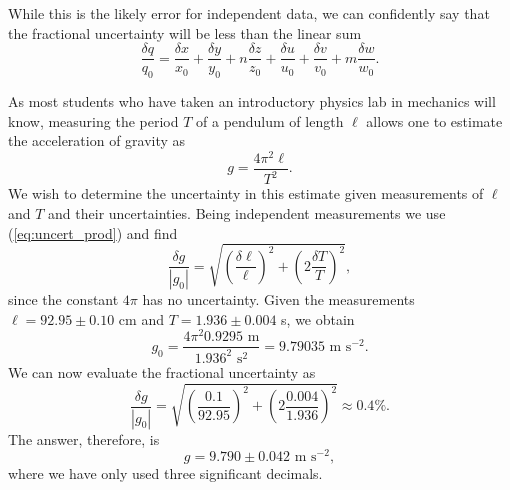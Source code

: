 While this is the likely error for independent data, we can confidently say that the fractional 
uncertainty will be less than the linear sum
\begin{equation}
\frac{\delta q}{q_0} = \frac{\delta x}{x_0} + \frac{\delta y }{y_0} +
n  \frac{\delta z}{z_0} +  \frac{\delta u}{u_0} +  \frac{\delta v}{v_0} +
m  \frac{\delta w}{w_0}.
\end{equation}
\begin{example}
As most students who have taken an introductory physics lab in mechanics will know, measuring
the period $T$ of a pendulum of length $\ell$ allows one to estimate the 
acceleration of gravity as 
\begin{equation}
g = \frac{4\pi^2 \ell}{T^2}.
\end{equation}	 
We wish to determine the uncertainty in this estimate given measurements of $\ell$ and $T$
and their uncertainties.  Being independent measurements we use (\ref{eq:uncert_prod}) and find
\begin{equation}
\frac{\delta g}{\left| g_0    \right |} = 
\sqrt{ \left( \frac{\delta \ell}{\ell}   \right)^2 + \left( 2 \frac{\delta T}{T}   \right)^2      },
\end{equation}	 
since the constant $4\pi$ has no uncertainty.  Given the measurements
$\ell  = 92.95 \pm 0.10$ cm and $T = 1.936 \pm 0.004$ s, we obtain
\begin{equation}
g_0 = \frac{4 \pi^2 0.9295\mbox{ m}}{1.936^2\mbox{ s}^2} = 9.79035 \mbox{ m s}^{-2}.
\end{equation}	 
We can now evaluate the fractional uncertainty as     
\begin{equation}
\frac{\delta g}{\left| g_0    \right |} = 
\sqrt{ \left( \frac{0.1}{92.95}   \right)^2 + \left( 2 \frac{0.004}{1.936}   \right)^2 } \approx 0.4\%.
\end{equation}	 
The answer, therefore, is
\begin{equation}
g = 9.790 \pm 0.042 \mbox{ m s}^{-2},
\end{equation}
where we have only used three significant decimals.
\end{example}


